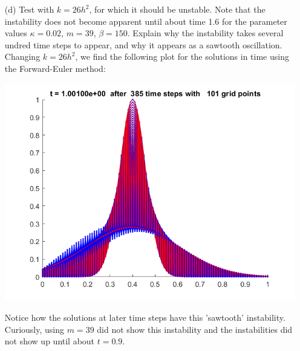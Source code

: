\documentclass{article}
\begin{document}
\begin{itemize}
    \item[(d)] Test  with $k = 26h^2$, for which it should be unstable. Note that the instability does not become apparent until about time 1.6 for the parameter values $\kappa = 0.02$, $m = 39$, $\beta = 150$. Explain why the instability takes several undred time steps to appear, and why it appears as a sawtooth oscillation.
    \newline\newline
    Changing $k = 26h^2$, we find the following plot for the solutions in time using the Forward-Euler method:
    \begin{center}
        \includegraphics[scale = 0.6]{FE26h2.png}
    \end{center}
    Notice how the solutions at later time steps have this 'sawtooth' instability. Curiously, using $m=39$ did not show this instability and the instabilities did not show up until about $t = 0.9$.
    
\end{itemize}
\end{document}
